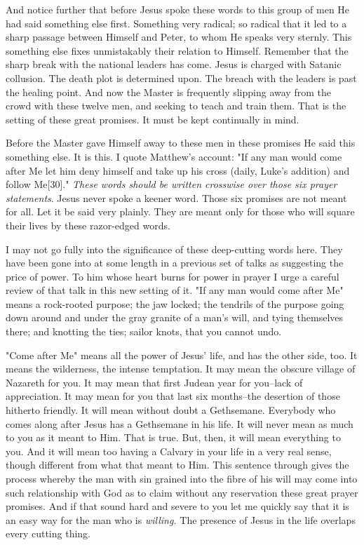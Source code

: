 And notice further that before Jesus spoke these words to this group of
men He had said something else first. Something very radical; so radical
that it led to a sharp passage between Himself and Peter, to whom He
speaks very sternly. This something else fixes unmistakably their relation
to Himself. Remember that the sharp break with the national leaders has
come. Jesus is charged with Satanic collusion. The death plot is
determined upon. The breach with the leaders is past the healing point.
And now the Master is frequently slipping away from the crowd with these
twelve men, and seeking to teach and train them. That is the setting of
these great promises. It must be kept continually in mind.

Before the Master gave Himself away to these men in these promises He said
this something else. It is this. I quote Matthew's account: "If any man
would come after Me let him deny himself and take up his cross (daily,
Luke's addition) and follow Me[30]." \textit{These words should be written
crosswise over those six prayer statements}. Jesus never spoke a keener
word. Those six promises are not meant for all. Let it be said very
plainly. They are meant only for those who will square their lives by
these razor-edged words.

I may not go fully into the significance of these deep-cutting words here.
They have been gone into at some length in a previous set of talks as
suggesting the price of power. To him whose heart burns for power in
prayer I urge a careful review of that talk in this new setting of it. "If
any man would come after Me" means a rock-rooted purpose; the jaw locked;
the tendrils of the purpose going down around and under the gray granite
of a man's will, and tying themselves there; and knotting the ties; sailor
knots, that you cannot undo.

"Come after Me" means all the power of Jesus' life, and has the other
side, too. It means the wilderness, the intense temptation. It may mean
the obscure village of Nazareth for you. It may mean that first Judean
year for you--lack of appreciation. It may mean for you that last six
months--the desertion of those hitherto friendly. It will mean without
doubt a Gethsemane. Everybody who comes along after Jesus has a Gethsemane
in his life. It will never mean as much to you as it meant to Him. That is
true. But, then, it will mean everything to you. And it will mean too
having a Calvary in your life in a very real sense, though different from
what that meant to Him. This sentence through gives the process whereby
the man with sin grained into the fibre of his will may come into such
relationship with God as to claim without any reservation these great
prayer promises. And if that sound hard and severe to you let me quickly
say that it is an easy way for the man who is \textit{willing.} The presence of
Jesus in the life overlaps every cutting thing.


